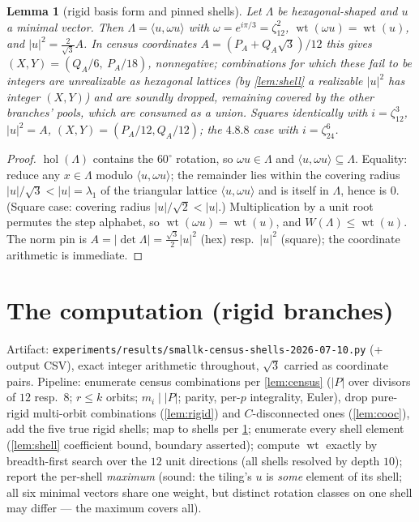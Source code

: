 \documentclass[11pt,a4paper,oneside]{article}
\theoremstyle{plain}
\newtheorem{lemma}[theorem]{Lemma}
\theoremstyle{definition}
\theoremstyle{remark}
\DeclareMathOperator{\wt}{wt}
\DeclareMathOperator{\hol}{hol}
\newcommand{\zt}[1]{\zeta_{#1}}
\begin{document}
\begin{lemma}[rigid basis form and pinned shells]\label{lem:basis}
Let $\Lambda$ be hexagonal-shaped and $u$ a minimal vector. Then $\Lambda = \langle u,
\omega u\rangle$ with $\omega = e^{i\pi/3} = \zt{12}^2$, $\wt(\omega u) = \wt(u)$, and
$|u|^2 = \tfrac{2}{\sqrt3}A$. In census coordinates $A = (P_A + Q_A\sqrt3)/12$ this gives
$(X, Y) = (Q_A/6,\ P_A/18)$, nonnegative; combinations for which these fail to be integers
are unrealizable as hexagonal lattices (by \cref{lem:shell} a realizable $|u|^2$ has integer
$(X,Y)$) and are soundly dropped, remaining covered by the other branches' pools, which are
consumed as a union. Squares identically with $i = \zt{12}^3$, $|u|^2 = A$,
$(X, Y) = (P_A/12, Q_A/12)$; the $4.8.8$ case with $i = \zt{24}^6$.
\end{lemma}

\begin{proof}
$\hol(\Lambda)$ contains the $60^\circ$ rotation, so $\omega u \in \Lambda$ and
$\langle u, \omega u\rangle \subseteq \Lambda$. Equality: reduce any $x \in \Lambda$ modulo
$\langle u, \omega u\rangle$; the remainder lies within the covering radius $|u|/\sqrt3 <
|u| = \lambda_1$ of the triangular lattice $\langle u, \omega u\rangle$ and is itself in
$\Lambda$, hence is $0$. (Square case: covering radius $|u|/\sqrt2 < |u|$.) Multiplication
by a unit root permutes the step alphabet, so $\wt(\omega u) = \wt(u)$, and
$W(\Lambda) \le \wt(u)$. The norm pin is $A = |{\det}\Lambda| = \tfrac{\sqrt3}{2}|u|^2$
(hex) resp.\ $|u|^2$ (square); the coordinate arithmetic is immediate.
\end{proof}

\section{The computation (rigid branches)}\label{sec:comp}

Artifact: \texttt{experiments/results/smallk-census-shells-2026-07-10.py} (+ output CSV),
exact integer arithmetic throughout, $\sqrt3$ carried as coordinate pairs. Pipeline:
enumerate census combinations per \cref{lem:census} ($|P|$ over divisors of $12$ resp.\ $8$;
$r \le k$ orbits; $m_i \mid |P|$; parity, per-$p$ integrality, Euler), drop pure-rigid
multi-orbit combinations (\cref{lem:rigid}) and $C$-disconnected ones (\cref{lem:cooc}), add
the five true rigid shells; map to shells per \cref{lem:basis}; enumerate every shell
element (\cref{lem:shell} coefficient bound, boundary asserted); compute $\wt$ exactly by
breadth-first search over the $12$ unit directions (all shells resolved by depth $10$);
report the per-shell \emph{maximum} (sound: the tiling's $u$ is \emph{some} element of its
shell; all six minimal vectors share one weight, but distinct rotation classes on one shell
may differ --- the maximum covers all).
\end{document}
